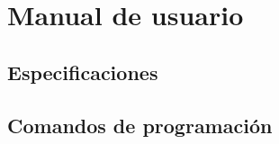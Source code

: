 \chapter[Manual de usuario]{Manual de usuario}
\label{cp:manual-usuario}

\section*{Especificaciones}

\section{Comandos de programación}


